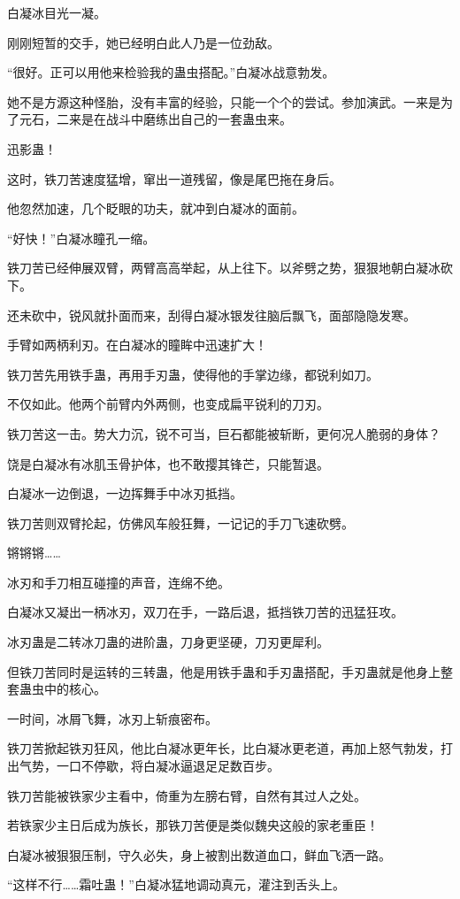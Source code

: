 \begin{this_body}
白凝冰目光一凝。

刚刚短暂的交手，她已经明白此人乃是一位劲敌。

“很好。正可以用他来检验我的蛊虫搭配。”白凝冰战意勃发。

她不是方源这种怪胎，没有丰富的经验，只能一个个的尝试。参加演武。一来是为了元石，二来是在战斗中磨练出自己的一套蛊虫来。

迅影蛊！

这时，铁刀苦速度猛增，窜出一道残留，像是尾巴拖在身后。

他忽然加速，几个眨眼的功夫，就冲到白凝冰的面前。

“好快！”白凝冰瞳孔一缩。

铁刀苦已经伸展双臂，两臂高高举起，从上往下。以斧劈之势，狠狠地朝白凝冰砍下。

还未砍中，锐风就扑面而来，刮得白凝冰银发往脑后飘飞，面部隐隐发寒。

手臂如两柄利刃。在白凝冰的瞳眸中迅速扩大！

铁刀苦先用铁手蛊，再用手刃蛊，使得他的手掌边缘，都锐利如刀。

不仅如此。他两个前臂内外两侧，也变成扁平锐利的刀刃。

铁刀苦这一击。势大力沉，锐不可当，巨石都能被斩断，更何况人脆弱的身体？

饶是白凝冰有冰肌玉骨护体，也不敢撄其锋芒，只能暂退。

白凝冰一边倒退，一边挥舞手中冰刃抵挡。

铁刀苦则双臂抡起，仿佛风车般狂舞，一记记的手刀飞速砍劈。

锵锵锵……

冰刃和手刀相互碰撞的声音，连绵不绝。

白凝冰又凝出一柄冰刃，双刀在手，一路后退，抵挡铁刀苦的迅猛狂攻。

冰刃蛊是二转冰刀蛊的进阶蛊，刀身更坚硬，刀刃更犀利。

但铁刀苦同时是运转的三转蛊，他是用铁手蛊和手刃蛊搭配，手刃蛊就是他身上整套蛊虫中的核心。

一时间，冰屑飞舞，冰刃上斩痕密布。

铁刀苦掀起铁刃狂风，他比白凝冰更年长，比白凝冰更老道，再加上怒气勃发，打出气势，一口不停歇，将白凝冰逼退足足数百步。

铁刀苦能被铁家少主看中，倚重为左膀右臂，自然有其过人之处。

若铁家少主日后成为族长，那铁刀苦便是类似魏央这般的家老重臣！

白凝冰被狠狠压制，守久必失，身上被割出数道血口，鲜血飞洒一路。

“这样不行……霜吐蛊！”白凝冰猛地调动真元，灌注到舌头上。


\end{this_body}
